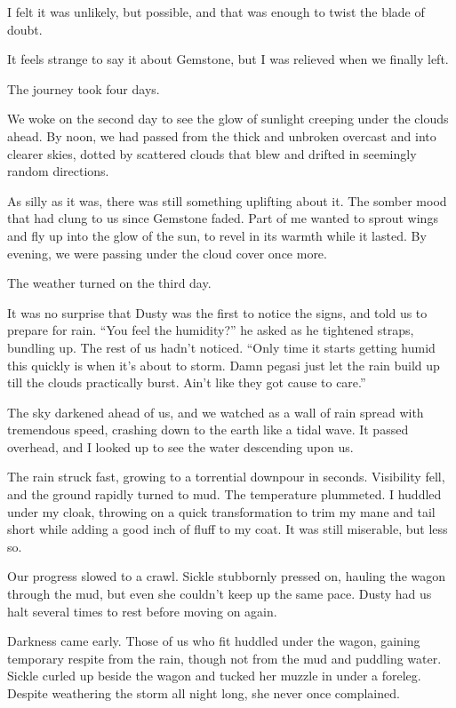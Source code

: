 I felt it was unlikely, but possible, and that was enough to twist the blade of doubt.

It feels strange to say it about Gemstone, but I was relieved when we finally left.

{\br}%
The journey took four days.

We woke on the second day to see the glow of sunlight creeping under the clouds ahead. By noon, we had passed from the thick and unbroken overcast and into clearer skies, dotted by scattered clouds that blew and drifted in seemingly random directions.

As silly as it was, there was still something uplifting about it. The somber mood that had clung to us since Gemstone faded. Part of me wanted to sprout wings and fly up into the glow of the sun, to revel in its warmth while it lasted. By evening, we were passing under the cloud cover once more.

The weather turned on the third day.

It was no surprise that Dusty was the first to notice the signs, and told us to prepare for rain. “You feel the humidity?” he asked as he tightened straps, bundling up. The rest of us hadn’t noticed. “Only time it starts getting humid this quickly is when it’s about to storm. Damn pegasi just let the rain build up till the clouds practically burst. Ain’t like they got cause to care.”

The sky darkened ahead of us, and we watched as a wall of rain spread with tremendous speed, crashing down to the earth like a tidal wave. It passed overhead, and I looked up to see the water descending upon us.

The rain struck fast, growing to a torrential downpour in seconds. Visibility fell, and the ground rapidly turned to mud. The temperature plummeted. I huddled under my cloak, throwing on a quick transformation to trim my mane and tail short while adding a good inch of fluff to my coat. It was still miserable, but less so.

Our progress slowed to a crawl. Sickle stubbornly pressed on, hauling the wagon through the mud, but even she couldn’t keep up the same pace. Dusty had us halt several times to rest before moving on again.

Darkness came early. Those of us who fit huddled under the wagon, gaining temporary respite from the rain, though not from the mud and puddling water. Sickle curled up beside the wagon and tucked her muzzle in under a foreleg. Despite weathering the storm all night long, she never once complained.

